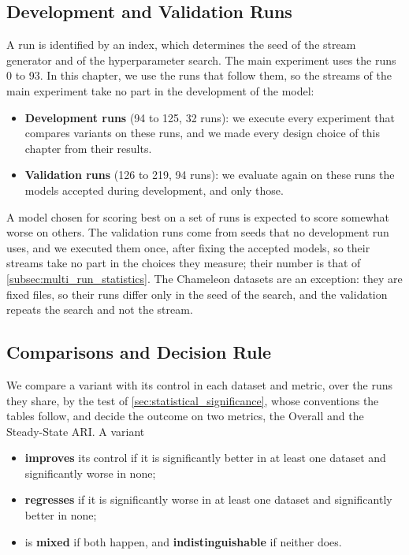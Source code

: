 \subsection{Development and Validation Runs}
\label{subsec:mi_runs}

A run is identified by an index, which determines the seed of the stream generator and of the hyperparameter search. The main experiment uses the runs 0 to 93. In this chapter, we use the runs that follow them, so the streams of the main experiment take no part in the development of the model:

\begin{itemize}
    \item \textbf{Development runs} (94 to 125, 32 runs): we execute every experiment that compares variants on these runs, and we made every design choice of this chapter from their results.
    \item \textbf{Validation runs} (126 to 219, 94 runs): we evaluate again on these runs the models accepted during development, and only those.
\end{itemize}

A model chosen for scoring best on a set of runs is expected to score somewhat worse on others. The validation runs come from seeds that no development run uses, and we executed them once, after fixing the accepted models, so their streams take no part in the choices they measure; their number is that of \cref{subsec:multi_run_statistics}. The Chameleon datasets are an exception: they are fixed files, so their runs differ only in the seed of the search, and the validation repeats the search and not the stream.

\subsection{Comparisons and Decision Rule}
\label{subsec:mi_decision_rule}

We compare a variant with its control in each dataset and metric, over the runs they share, by the test of \cref{sec:statistical_significance}, whose conventions the tables follow, and decide the outcome on two metrics, the Overall and the Steady-State ARI. A variant

\begin{itemize}
    \item \textbf{improves} its control if it is significantly better in at least one dataset and significantly worse in none;
    \item \textbf{regresses} if it is significantly worse in at least one dataset and significantly better in none;
    \item is \textbf{mixed} if both happen, and \textbf{indistinguishable} if neither does.
\end{itemize}

